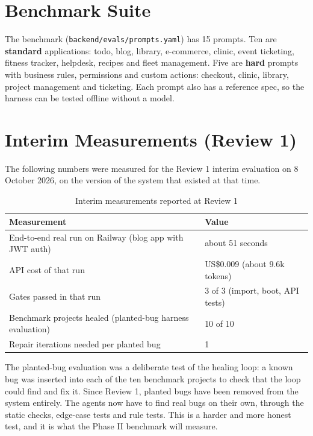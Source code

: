 \documentclass[12pt,a4paper]{report}
\begin{document}
\section{Benchmark Suite}

The benchmark (\texttt{backend/evals/prompts.yaml}) has 15 prompts. Ten are \textbf{standard} applications: todo, blog, library, e-commerce, clinic, event ticketing, fitness tracker, helpdesk, recipes and fleet management. Five are \textbf{hard} prompts with business rules, permissions and custom actions: checkout, clinic, library, project management and ticketing. Each prompt also has a reference spec, so the harness can be tested offline without a model.

\section{Interim Measurements (Review 1)}

The following numbers were measured for the Review 1 interim evaluation on 8 October 2026, on the version of the system that existed at that time.

\begin{table}[!ht]
    \centering
    \renewcommand{\arraystretch}{1.3}
    \caption{Interim measurements reported at Review 1}
    \label{tab:interim}
    \begin{tabular}{|p{7cm}|p{6cm}|}
    \hline
    \textbf{Measurement} & \textbf{Value} \\\hline
    End-to-end real run on Railway (blog app with JWT auth) & about 51 seconds \\\hline
    API cost of that run & US\$0.009 (about 9.6k tokens) \\\hline
    Gates passed in that run & 3 of 3 (import, boot, API tests) \\\hline
    Benchmark projects healed (planted-bug harness evaluation) & 10 of 10 \\\hline
    Repair iterations needed per planted bug & 1 \\\hline
    \end{tabular}
\end{table}

The planted-bug evaluation was a deliberate test of the healing loop: a known bug was inserted into each of the ten benchmark projects to check that the loop could find and fix it. Since Review 1, planted bugs have been removed from the system entirely. The agents now have to find real bugs on their own, through the static checks, edge-case tests and rule tests. This is a harder and more honest test, and it is what the Phase II benchmark will measure.
\end{document}
